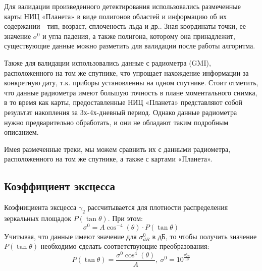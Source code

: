 Для валидации произведенного детектирования использовались размеченные карты НИЦ «Планета» в виде полигонов областей и информацию об их содержании
- тип, возраст, сплоченость льда и др.. Зная координаты точки, ее значение $\sigma^0$ и угла падения, а также полигона,
которому она принадлежит, существующие данные можно разметить для валидации после работы алгоритма. 

Также для валидации использовались данные с радиометра (GMI), расположенного на том же спутнике, что упрощает нахождение
информации за конкретную дату, т.к. приборы установленны на одном спутнике. Стоит отметить, что данные радиометра имеют
большую точность в плане моментального снимка, в то время как карты, предоставленные НИЦ «Планета» представляют собой
результат накопления за 3х-4х-дневный период. Однако данные радиометра нужно предварительно обработать, и они не
обладают таким подробным описанием.

Имея размеченные треки, мы можем сравнить их с данными радиометра, расположенного на том же спутнике, а также с
картами «Планета».


\subsection{Коэффициент эксцесса}

Коэфиициента эксцесса $\gamma_2$ рассчитывается для плотности распределения зеркальных площадок $P(\tan \theta)$. При этом: 
\begin{equation}
  \sigma^0 = A \cos^{-4}(\theta) \cdot P(\tan \theta)
  \label{eq:8}
\end{equation}
Учитывая, что данные имеют значение для $\sigma^0_{dB}$ в дБ, то чтобы получить значение $P(\tan \theta)$ необходимо сделать
соответствующие преобразования:
\begin{equation}
  P(\tan \theta) =  \frac{\sigma^0 \cos^4(\theta)}{A},~ \sigma^0 = 10^{\frac{\sigma^0_{dB}}{10}}
  \label{eq:9}
\end{equation}

